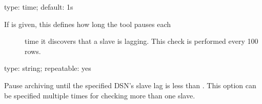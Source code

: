 \documentclass[letterpaper,10pt,english]{sphinxmanual}
\begin{document}

\begin{fulllineitems}
\label{\detokenize{mariadb-archiver:cmdoption-mariadb-archiver-check-interval}}
type: time; default: 1s
\begin{description}
\item[{If {\hyperref[\detokenize{mariadb-archiver:cmdoption-mariadb-archiver-check-slave-lag}]{}} is given, this defines how long the tool pauses each}] \leavevmode
time it discovers that a slave is lagging.
This check is performed every 100 rows.

\end{description}

\end{fulllineitems}


\begin{fulllineitems}
\label{\detokenize{mariadb-archiver:cmdoption-mariadb-archiver-check-slave-lag}}
type: string; repeatable: yes

Pause archiving until the specified DSN’s slave lag is less than {\hyperref[\detokenize{mariadb-archiver:cmdoption-mariadb-archiver-max-lag}]{}}.
This option can be specified multiple times for checking more than one slave.

\end{fulllineitems}
\end{document}
